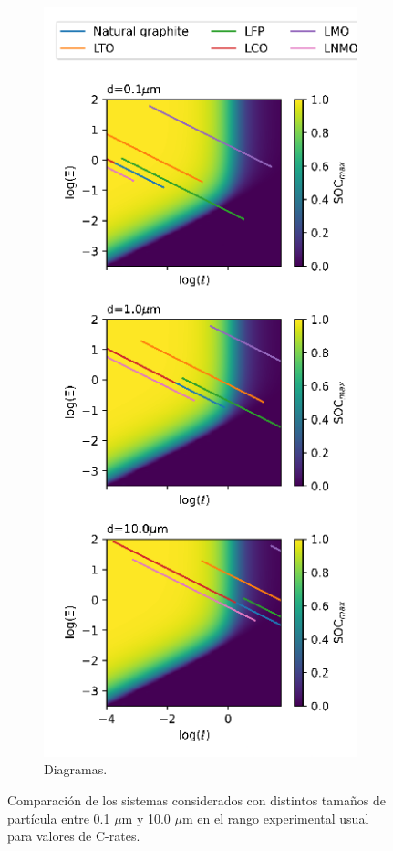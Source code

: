 \begin{figure}[h!]
\begin{subfigure}{.375\textwidth}
        \includegraphics[height=.4\textheight]{FastCharging/un/resultados/comparacion/comparacion-mapa.png}
        \caption{Diagramas.}
        \label{fig:comparacion-mapa}
    \end{subfigure}
    \caption{Comparación de los sistemas considerados con distintos tamaños de 
    partícula entre 0.1 $\mu$m y 10.0 $\mu$m en el rango experimental usual para 
    valores de C-rates.}
    \label{fig:comparacion}
\end{figure}

